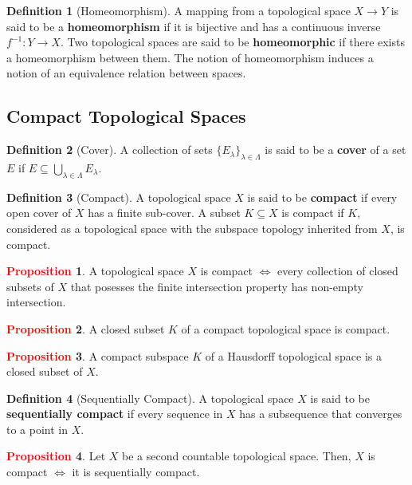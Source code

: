 \documentclass[11pt]{article}
\theoremstyle{definition}
\theoremstyle{definition}
\theoremstyle{definition}
\newtheorem{definition}{\textcolor{OliveGreen}{Definition}}
\newtheorem{prop}{\textcolor{red}{Proposition}}
\theoremstyle{remark}
\begin{document}
\begin{definition}[Homeomorphism]
	A mapping from a topological space $X \rightarrow Y$ is said to be a \textbf{homeomorphism} if it is bijective and has a continuous inverse $f^{-1}: Y \rightarrow X$. Two topological spaces are said to be \textbf{homeomorphic} if there exists a homeomorphism between them. The notion of homeomorphism induces a notion of an equivalence relation between spaces. 
\end{definition}

\subsection{Compact Topological Spaces}

\begin{definition}[Cover]
	A collection of sets $\{ E_\lambda \}_{\lambda \in \Lambda }$ is said to be a \textbf{cover} of a set $E$ if $E \subseteq \bigcup_{\lambda \in \Lambda } E_\lambda$. 
\end{definition}

\begin{definition}[Compact]
	A topological space $X$ is said to be \textbf{compact} if every open cover of $X$ has a finite sub-cover. A subset $K \subseteq X$ is compact if $K$, considered as a topological space with the subspace topology inherited from $X$, is compact. 
\end{definition}

\begin{prop}
	A topological space $X$ is compact $\iff$ every collection of closed subsets of $X$ that posesses the finite intersection property has non-empty intersection. 
\end{prop}

\begin{prop}
	A closed subset $K$ of a compact topological space is compact. 
\end{prop}

\begin{prop}
	A compact subspace $K$ of a Hausdorff topological space is a closed subset of $X$. 
\end{prop}

\begin{definition}[Sequentially Compact] 
	A topological space $X$ is said to be \textbf{sequentially compact} if every sequence in $X$ has a subsequence that converges to a point in $X$. 
\end{definition}

\begin{prop}
	Let $X$ be a second countable topological space. Then, $X$ is compact $\iff$ it is sequentially compact. 
\end{prop}
\end{document}
